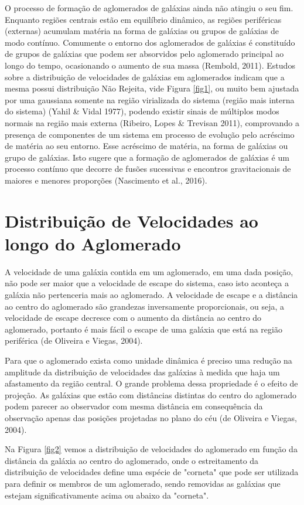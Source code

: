 O processo de formação de aglomerados de galáxias ainda não atingiu o seu fim. Enquanto regiões centrais estão em equilíbrio dinâmico, as regiões periféricas (externas) acumulam matéria na forma de galáxias ou grupos de galáxias de modo contínuo. Comumente o entorno dos aglomerados de galáxias é constituído de grupos de galáxias que podem ser absorvidos pelo aglomerado principal ao longo do tempo, ocasionando o aumento de sua massa (Rembold, 2011). Estudos sobre a distribuição de velocidades de galáxias em aglomerados indicam que a mesma possui distribuição Não Rejeita, vide Figura \ref{fig1}, ou muito bem ajustada por uma gaussiana somente na região virializada do sistema (região mais interna do sistema) (Yahil \& Vidal 1977), podendo existir sinais de múltiplos modos normais na região mais externa (Ribeiro, Lopes \& Trevisan 2011), comprovando a presença de componentes de um sistema em processo de evolução pelo acréscimo de matéria ao seu entorno. Esse acréscimo de matéria, na forma de galáxias ou grupo de galáxias.  Isto sugere que a formação de aglomerados de galáxias é um processo contínuo que decorre de fusões sucessivas e encontros gravitacionais de maiores e menores proporções (Nascimento et al., 2016).


\section{Distribuição de Velocidades ao longo do Aglomerado}
A velocidade de uma galáxia contida em um aglomerado, em uma dada posição, não pode ser maior que a velocidade de escape do sistema, caso isto aconteça a galáxia não pertenceria mais ao aglomerado. A velocidade de escape e a distância ao centro do aglomerado são grandezas inversamente proporcionais, ou seja, a velocidade de escape decresce com o aumento da distância ao centro do aglomerado, portanto é mais fácil o escape de uma galáxia que está na região periférica (de Oliveira e Viegas, 2004).

Para que o aglomerado exista como unidade dinâmica é preciso uma redução na amplitude da distribuição de velocidades das galáxias à medida que haja um afastamento da região central. O grande problema dessa propriedade é o efeito de projeção. As galáxias que estão com distâncias distintas do centro do aglomerado podem parecer ao observador com mesma distância em consequência da observação apenas das posições projetadas no plano do céu (de Oliveira e Viegas, 2004).

Na Figura \ref{fig2} vemos a distribuição de velocidades do aglomerado em função da distância da galáxia ao centro do aglomerado, onde o estreitamento da distribuição de velocidades define uma espécie de "corneta" que pode ser utilizada para definir os membros de um aglomerado, sendo removidas as galáxias que estejam significativamente acima ou abaixo da "corneta".

